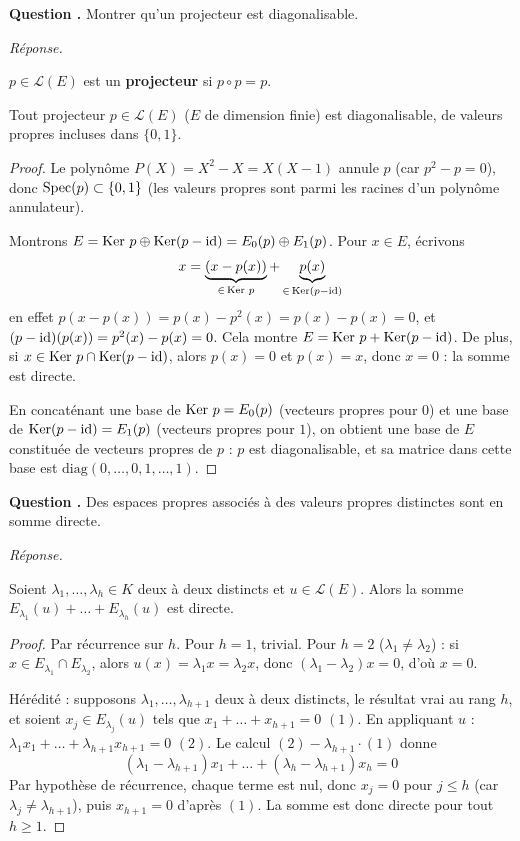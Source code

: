 \documentclass[11pt]{article}
\newcounter{qnum}
\newcommand{\question}[1]{%
\stepcounter{qnum}%
\bigskip
\noindent\textbf{Question \theqnum.} #1\par}
\newcommand{\reponse}{\noindent\textit{Réponse.}\ }
\begin{document}
\question{Montrer qu'un projecteur est diagonalisable.}
\reponse
\begin{defi}
$p\in\mathcal{L}(E)$ est un \textbf{projecteur} si $p\circ p=p$.
\end{defi}

\begin{prop}
Tout projecteur $p\in\mathcal{L}(E)$ ($E$ de dimension finie) est diagonalisable, de valeurs propres incluses dans $\{0,1\}$.
\end{prop}

\begin{proof}
Le polynôme $P(X)=X^2-X=X(X-1)$ annule $p$ (car $p^2-p=0$), donc $\operatorname{Spec}(p)\subset\{0,1\}$ (les valeurs propres sont parmi les racines d'un polynôme annulateur).

Montrons $E=\operatorname{Ker}\,p \oplus \operatorname{Ker}(p-\operatorname{id}) = E_0(p)\oplus E_1(p)$. Pour $x\in E$, écrivons
\[x = \underbrace{(x-p(x))}_{\in\,\operatorname{Ker}\,p} + \underbrace{p(x)}_{\in\,\operatorname{Ker}(p-\operatorname{id})}\]
en effet $p(x-p(x))=p(x)-p^2(x)=p(x)-p(x)=0$, et $(p-\operatorname{id})(p(x))=p^2(x)-p(x)=0$. Cela montre $E=\operatorname{Ker}\,p+\operatorname{Ker}(p-\operatorname{id})$. De plus, si $x\in\operatorname{Ker}\,p\cap\operatorname{Ker}(p-\operatorname{id})$, alors $p(x)=0$ et $p(x)=x$, donc $x=0$ : la somme est directe.

En concaténant une base de $\operatorname{Ker}\,p=E_0(p)$ (vecteurs propres pour $0$) et une base de $\operatorname{Ker}(p-\operatorname{id})=E_1(p)$ (vecteurs propres pour $1$), on obtient une base de $E$ constituée de vecteurs propres de $p$ : $p$ est diagonalisable, et sa matrice dans cette base est $\mathrm{diag}(0,\dots,0,1,\dots,1)$.
\end{proof}

\question{Des espaces propres associés à des valeurs propres distinctes sont en somme directe.}
\reponse
\begin{prop}
Soient $\lambda_1,\dots,\lambda_h\in K$ deux à deux distincts et $u\in\mathcal{L}(E)$. Alors la somme $E_{\lambda_1}(u)+\dots+E_{\lambda_h}(u)$ est directe.
\end{prop}

\begin{proof}
Par récurrence sur $h$. Pour $h=1$, trivial. Pour $h=2$ ($\lambda_1\neq\lambda_2$) : si $x\in E_{\lambda_1}\cap E_{\lambda_2}$, alors $u(x)=\lambda_1 x=\lambda_2 x$, donc $(\lambda_1-\lambda_2)x=0$, d'où $x=0$.

Hérédité : supposons $\lambda_1,\dots,\lambda_{h+1}$ deux à deux distincts, le résultat vrai au rang $h$, et soient $x_j\in E_{\lambda_j}(u)$ tels que $x_1+\dots+x_{h+1}=0$ $(1)$. En appliquant $u$ : $\lambda_1x_1+\dots+\lambda_{h+1}x_{h+1}=0$ $(2)$. Le calcul $(2)-\lambda_{h+1}\cdot(1)$ donne
\[(\lambda_1-\lambda_{h+1})x_1+\dots+(\lambda_h-\lambda_{h+1})x_h=0\]
Par hypothèse de récurrence, chaque terme est nul, donc $x_j=0$ pour $j\leq h$ (car $\lambda_j\neq\lambda_{h+1}$), puis $x_{h+1}=0$ d'après $(1)$. La somme est donc directe pour tout $h\geq 1$.
\end{proof}
\end{document}
